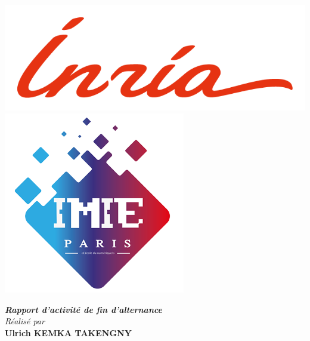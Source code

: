 \documentclass[a4paper, oneside, 12pt, final]{extreport}
\title{\reportSubject}
\author{\reportAuthor}
\newcommand{\reportAuthor} {
  \textbf{Ulrich KEMKA TAKENGNY}
}
\begin{document}
\thispagestyle{empty}
\begin{titlepage}
  \begin{center}


    \includegraphics[scale=0.7]{./images/inr_logo_rouge.png}
    \hfill
    \includegraphics[scale=0.4]{./images/logonoir.png}

    \vspace{3cm}




    \textbf{\textit{Rapport d'activité de fin d'alternance}}\\

    \vspace{5pt}
    {\textit{Réalisé par}}\\
    \vspace{10pt} {%
      \fontsize{14pt}{14pt}\selectfont
      {\bfseries\Large\sc \reportAuthor}\\
    }

    \vspace{15pt}


\end{center}
\end{titlepage}
\end{document}
